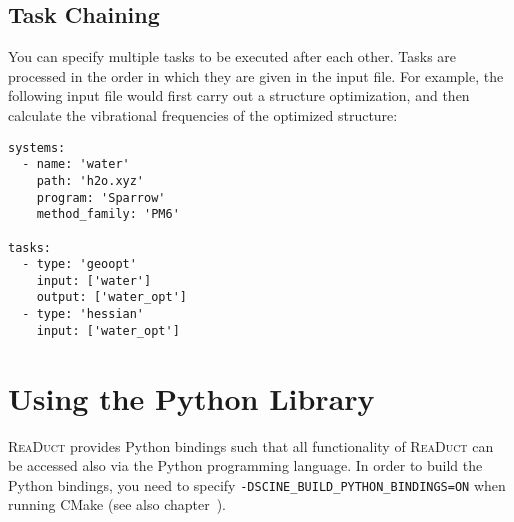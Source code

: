 \documentclass[]{tufte-book}
\begin{document}
\section{Task Chaining}
\label{sec:task_chaining}

You can specify multiple tasks to be executed after each other. Tasks are processed in the order in which they are given in
the input file. For example, the following input file would first carry out a structure optimization, and then calculate
the vibrational frequencies of the optimized structure:

\begin{verbatim}
systems:
  - name: 'water'
    path: 'h2o.xyz'
    program: 'Sparrow'
    method_family: 'PM6'

tasks:
  - type: 'geoopt'
    input: ['water']
    output: ['water_opt']
  - type: 'hessian'
    input: ['water_opt']
\end{verbatim}



\chapter{Using the Python Library}

\textsc{ReaDuct} provides Python bindings such that all functionality of \textsc{ReaDuct} can be accessed also via the
Python programming language. In order to build the Python bindings, you need to specify \texttt{-DSCINE\_BUILD\_PYTHON\_BINDINGS=ON}
when running CMake (see also chapter~).
\end{document}

